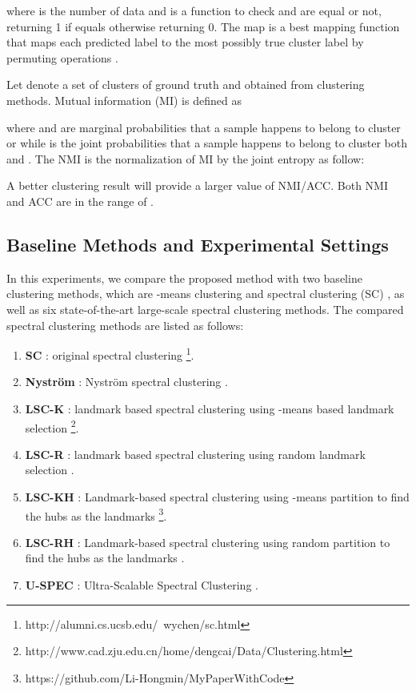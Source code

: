\documentclass[a4paper,fleqn]{cas-dc}
\begin{document}
where  is the number of data  and  is a function to check  and  are equal or not,  returning 1 if equals otherwise returning 0. The map is a best mapping function that maps each predicted label to the most possibly true cluster label by permuting operations \cite{xu2003document}.

Let  denote a set of clusters of ground truth and  obtained from clustering methods. Mutual information (MI) is defined as

where  and  are marginal probabilities that a sample happens to belong to cluster  or  while  is the joint probabilities that a sample happens to belong to cluster both  and .
The NMI is the normalization of MI by the joint entropy as follow:


A better clustering result will provide a larger value of NMI/ACC. Both NMI and ACC are in the range of .


\subsection{Baseline Methods and Experimental Settings}

In this experiments, we compare the proposed method with two baseline clustering methods, which are -means clustering and spectral clustering (SC) \cite{chen2010parallel} , as well as six state-of-the-art large-scale spectral clustering methods. The compared spectral clustering methods are listed as follows:

\begin{enumerate}
  \item \textbf{SC} \cite{chen2010parallel}: original spectral clustering \footnote{\label{psc}http://alumni.cs.ucsb.edu/~wychen/sc.html}.
  \item \textbf{Nystr\"{o}m} \cite{fowlkes2004spectral}: Nystr\"{o}m spectral clustering .
  \item \textbf{LSC-K} \cite{cai2014large}: landmark based spectral clustering using -means based landmark selection \footnote{\label{LSC}http://www.cad.zju.edu.cn/home/dengcai/Data/Clustering.html}.
  \item \textbf{LSC-R} \cite{cai2014large}: landmark based spectral clustering using random landmark selection .
  \item \textbf{LSC-KH} \cite{ye2018large}: Landmark-based spectral clustering using -means partition to find the hubs as the landmarks \footnote{\label{mycode}https://github.com/Li-Hongmin/MyPaperWithCode}.
  \item \textbf{LSC-RH} \cite{ye2018large}: Landmark-based spectral clustering using random partition to find the hubs as the landmarks .
  \item \textbf{U-SPEC} \cite{huang2019ultra}: Ultra-Scalable Spectral Clustering .
\end{enumerate}
\end{document}
